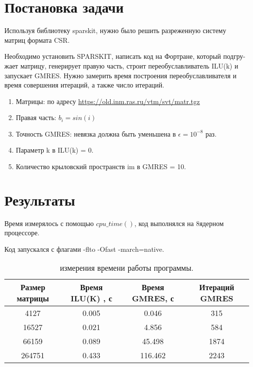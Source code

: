 


	\tableofcontents
	
	\section{Постановка задачи}
	
	 Используя библиотеку sparskit, нужно было решить разреженную систему матриц формата CSR.
	 
	 Необходимо установить SPARSKIT, написать код на Фортране, который подгру-
	 жает матрицу, генерирует правую часть, строит переобуславливатель ILU(k) и запускает
	 GMRES. Нужно замерить время построения переобуславливателя и время совершения итераций, а также число итераций.
	
	\begin{enumerate}
		\item Матрицы: по адресу \url{https://old.inm.ras.ru/vtm/svt/matr.tgz}
		\item Правая часть: $b_i = sin(i)$
		\item Точность GMRES: невязка должна быть уменьшена в $\epsilon = 10^{-8}$ раз.
		\item Параметр k в ILU(k) = 0.
		\item Количество крыловский пространств im в GMRES = 10.
	\end{enumerate}
	
	\section{Результаты}
	
	Время измерялось с помощью $cpu \_ time()$, код выполнялся на 8ядерном процессоре.
	
	Код запускался с флагами -flto -Ofast -march=native.
	
\begin{table}[h!]
	\centering
	\begin{tabular}{ | c | c | c | c | }
		\hline
		Размер матрицы & Время ILU(K) , с & Время GMRES, с & Итераций GMRES \\  [0.5ex]
		\hline\hline
		4127 & 0.005 &  0.046 & 315 \\
		\hline
		16527 & 0.021 & 4.856 & 584 \\
		\hline
		66159 & 0.089 & 45.498 & 1874 \\
		\hline
		264751 & 0.433 & 116.462 &  2243 \\
		\hline
	\end{tabular}
	\caption{измерения времени работы программы.}
	\label{table:1}
\end{table}
	
